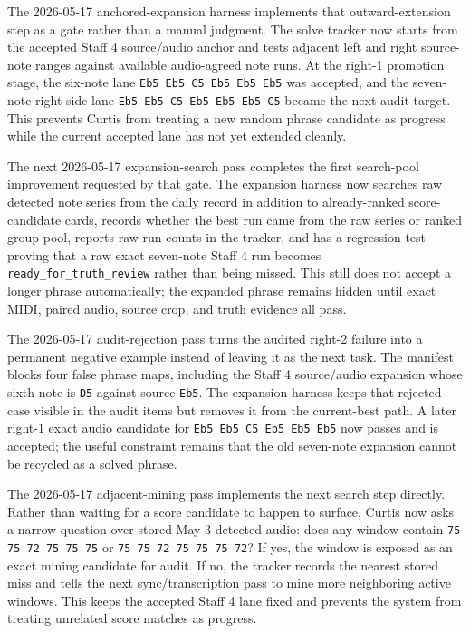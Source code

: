 The 2026-05-17 anchored-expansion harness implements that outward-extension step as a gate rather than a manual judgment. The solve tracker now starts from the accepted Staff 4 source/audio anchor and tests adjacent left and right source-note ranges against available audio-agreed note runs. At the right-1 promotion stage, the six-note lane \texttt{Eb5 Eb5 C5 Eb5 Eb5 Eb5} was accepted, and the seven-note right-side lane \texttt{Eb5 Eb5 C5 Eb5 Eb5 Eb5 C5} became the next audit target. This prevents Curtis from treating a new random phrase candidate as progress while the current accepted lane has not yet extended cleanly.

The next 2026-05-17 expansion-search pass completes the first search-pool improvement requested by that gate. The expansion harness now searches raw detected note series from the daily record in addition to already-ranked score-candidate cards, records whether the best run came from the raw series or ranked group pool, reports raw-run counts in the tracker, and has a regression test proving that a raw exact seven-note Staff 4 run becomes \texttt{ready\_for\_truth\_review} rather than being missed. This still does not accept a longer phrase automatically; the expanded phrase remains hidden until exact MIDI, paired audio, source crop, and truth evidence all pass.

The 2026-05-17 audit-rejection pass turns the audited right-2 failure into a permanent negative example instead of leaving it as the next task. The manifest blocks four false phrase maps, including the Staff 4 source/audio expansion whose sixth note is \texttt{D5} against source \texttt{Eb5}. The expansion harness keeps that rejected case visible in the audit items but removes it from the current-best path. A later right-1 exact audio candidate for \texttt{Eb5 Eb5 C5 Eb5 Eb5 Eb5} now passes and is accepted; the useful constraint remains that the old seven-note expansion cannot be recycled as a solved phrase.

The 2026-05-17 adjacent-mining pass implements the next search step directly. Rather than waiting for a score candidate to happen to surface, Curtis now asks a narrow question over stored May 3 detected audio: does any window contain \texttt{75 75 72 75 75 75} or \texttt{75 75 72 75 75 75 72}? If yes, the window is exposed as an exact mining candidate for audit. If no, the tracker records the nearest stored miss and tells the next sync/transcription pass to mine more neighboring active windows. This keeps the accepted Staff 4 lane fixed and prevents the system from treating unrelated score matches as progress.

